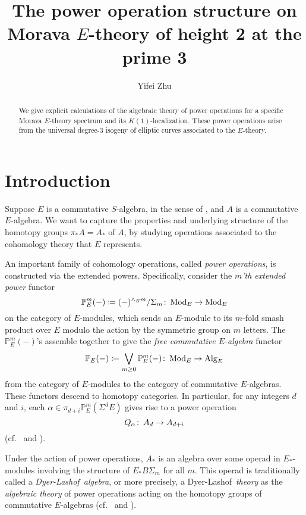 \documentclass{gtpart}
\title{The power operation structure on Morava $E$-theory of height 2 at the prime 3}
\author{Yifei Zhu}
\theoremstyle{definition}
\theoremstyle{remark}
\def\co{\colon\thinspace}
\newcommand{\mb}[1]{\mathbb{#1}}
\newcommand{\Mod}{{\rm Mod}}
\newcommand{\Alg}{{\rm Alg}}
\newcommand{\DL}{Dyer-Lashof~}
\newcommand{\BP}{{\mb P}}
\newcommand{\A}{\alpha}
\begin{document}
\begin{abstract}
 We give explicit calculations of the algebraic theory of power 
 operations for a specific Morava $E$-theory spectrum and its 
 $K(1)$-localization.  These power operations arise from the universal 
 degree-3 isogeny of elliptic curves associated to the $E$-theory.  
\end{abstract}


\maketitle
\section{Introduction}

Suppose $E$ is a commutative $S$-algebra, in the sense of \cite{EKMM}, 
and $A$ is a commutative $E$-algebra.  We want to capture the properties 
and underlying structure of the homotopy groups $\pi_* A = A_*$ of $A$, 
by studying operations associated to the cohomology theory that $E$ 
represents.  

An important family of cohomology operations, called {\em power 
operations}, is constructed via the extended powers.  Specifically, 
consider the {\em $m$'th extended power} functor 
\[
 \BP_E^m (-) \coloneqq (-)^{\wedge_E m} / \Sigma_m \co \Mod_E \to \Mod_E 
\]
on the category of $E$-modules, which sends an $E$-module to its 
$m$-fold smash product over $E$ modulo the action by the symmetric group 
on $m$ letters.  The $\BP_E^m (-)$'s assemble together to give the {\em 
free commutative $E$-algebra} functor 
\[
 \BP_E (-) \coloneqq \bigvee_{m \geq 0} \BP_E^m (-) \co \Mod_E \to \Alg_E 
\]
from the category of $E$-modules to the category of commutative 
$E$-algebras.  These functors descend to homotopy categories.  In 
particular, for any integers $d$ and $i$, each 
$\A \in \pi_{d+i} \BP_E^m (\Sigma^d E)$ gives rise to a power operation 
\[
 Q_\A \co A_d \to A_{d+i} 
\]
(cf.~\cite[Sections I.2 and IX.1]{H_infty} and \cite[Section 3]{cong}).  

Under the action of power operations, $A_*$ is an algebra over some 
operad in $E_*$-modules involving the structure of $E_* B\Sigma_m$ for 
all $m$.  This operad is traditionally called a {\em \DL algebra}, or 
more precisely, a \DL {\em theory} as the {\em algebraic theory} of 
power operations acting on the homotopy groups of commutative 
$E$-algebras (cf.~\cite[Chapters III, VIII, and IX]{H_infty} and 
\cite[Section 9]{lpo}).  
\end{document}
